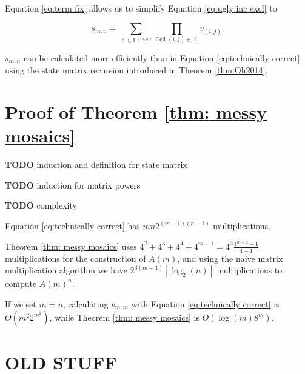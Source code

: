 \documentclass[12pt]{article}
\theoremstyle{plain}
\theoremstyle{definition}
\theoremstyle{remark}
\theoremstyle{definition}
\begin{document}
Equation \ref{eq:term fix} allows us to simplify Equation \ref{eq:ugly inc excl} to

\begin{equation}
    s_{m,n} = \sum_{\ell \in \mathbb{L}^{(m,n)}} \prod_{\text{Cell }(i,j) \in \ell} v_{(i,j)}.
\label{eq:technically correct}
\end{equation}

$s_{m,n}$ can be calculated more efficiently than in Equation \ref{eq:technically correct} using the state matrix recursion introduced in Theorem \ref{thm:Oh2014}.

\section{Proof of Theorem \ref{thm: messy mosaics}}



\textbf{TODO} induction and definition for state matrix

\textbf{TODO} induction for matrix powers


\textbf{TODO} complexity 

Equation \ref{eq:technically correct} has $mn 2^{(m-1)(n-1)}$ multiplications.

Theorem \ref{thm: messy mosaics} uses $4^2 + 4^3 + 4^4 + 4^{m-1} = 4^2 \frac{4^{m-2}-1}{4-1}$ multiplications for the construction of $A(m)$, and using the naive matrix multiplication algorithm we have ${2^{3(m-1)}}\left\lceil \log_2(n) \right\rceil$ multiplications to compute $A(m)^n$.

If we set $m=n$, calculating $s_{m,m}$ with Equation \ref{eq:technically correct} is $O(m^2 2^{m^2})$, while Theorem \ref{thm: messy mosaics} is $O(\log(m)8^m)$.

\section{OLD STUFF}
\end{document}
